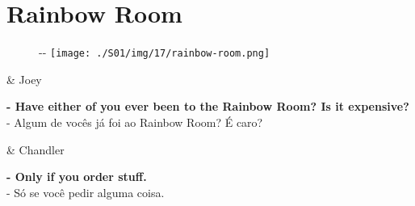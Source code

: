 \hypertarget{rainbow-room}{%
\section{Rainbow Room}\label{rainbow-room}}

\begin{figure}[!ht]
  \begin{adjustwidth}{-\oddsidemargin-1in}{-\rightmargin}
    \centering
    \texttt{[image: ./S01/img/17/rainbow-room.png]}
  \end{adjustwidth}
\end{figure}

\begin{tcolorbox}[enhanced,center upper,
    drop fuzzy shadow southeast, boxrule=0.3pt,
    lower separated=false,
    colframe=black!30!dialogoBorder,colback=white]
\begin{minipage}[c]{0.16\linewidth}
   & \centering \scriptsize{Joey}
\end{minipage}
\hfill
\begin{minipage}[c]{0.8\linewidth}
  \textbf{- Have either of you ever been to the Rainbow Room? Is it expensive?}\\
  - Algum de vocês já foi ao Rainbow Room? É caro?
\end{minipage}

\medskip
\begin{minipage}[c]{0.16\linewidth}
   & \centering \scriptsize{Chandler}
\end{minipage}
\hfill
\begin{minipage}[c]{0.8\linewidth}
  \textbf{- Only if you order stuff.}\\
  - Só se você pedir alguma coisa.
\end{minipage}
\end{tcolorbox}

